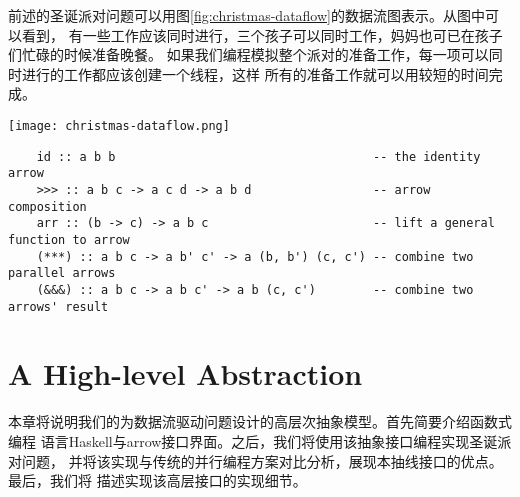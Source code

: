 \documentclass[conference]{IEEEtran}
\begin{document}
前述的圣诞派对问题可以用图\ref{fig:christmas-dataflow}的数据流图表示。从图中可以看到，
有一些工作应该同时进行，三个孩子可以同时工作，妈妈也可已在孩子们忙碌的时候准备晚餐。
如果我们编程模拟整个派对的准备工作，每一项可以同时进行的工作都应该创建一个线程，这样
所有的准备工作就可以用较短的时间完成。
\begin{figure*}[!t]
  \centering
  \texttt{[image: christmas-dataflow.png]}
  \caption{The Chistmas Eve party data-flow}
  \label{fig:christmas-dataflow}
\end{figure*}
\begin{figure*}
  \begin{verbatim}
    id :: a b b                                    -- the identity arrow
    >>> :: a b c -> a c d -> a b d                 -- arrow composition
    arr :: (b -> c) -> a b c                       -- lift a general function to arrow
    (***) :: a b c -> a b' c' -> a (b, b') (c, c') -- combine two parallel arrows
    (&&&) :: a b c -> a b c' -> a b (c, c')        -- combine two arrows' result
  \end{verbatim}
  \caption{Combinators for arrow programming}
  \label{fig:arrows-interface}
\end{figure*}

\section{A High-level Abstraction}\label{sec:a-high-level-abstraction}
本章将说明我们的为数据流驱动问题设计的高层次抽象模型。首先简要介绍函数式编程
语言Haskell与arrow接口界面。之后，我们将使用该抽象接口编程实现圣诞派对问题，
并将该实现与传统的并行编程方案对比分析，展现本抽线接口的优点。最后，我们将
描述实现该高层接口的实现细节。
\end{document}
